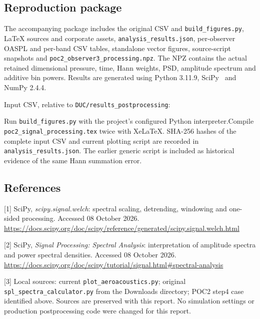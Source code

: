 \documentclass[english]{achleitner-report}
\begin{document}
\subsection*{Reproduction package}
The accompanying package includes the original CSV and \texttt{build\_figures.py}, LaTeX sources and corporate assets, \texttt{analysis\_results.json}, per-observer OASPL and per-band CSV tables, standalone vector figures, source-script snapshots and \texttt{poc2\_observer3\_processing.npz}. The NPZ contains the actual retained dimensional pressure, time, Hann weights, PSD, amplitude spectrum and additive bin powers. Results are generated using Python 3.11.9, SciPy \ScipyVersion\ and NumPy 2.4.4.

Input CSV, relative to \texttt{DUC/results\_postprocessing}:\\
\newline
{}

Run \texttt{build\_figures.py} with the project's configured Python interpreter.\newline Compile \texttt{poc2\_signal\_processing.tex} twice with XeLaTeX. SHA-256 hashes of the complete input CSV and current plotting script are recorded in \texttt{analysis\_results.json}. The earlier generic script is included as historical evidence of the same Hann summation error.

\subsection*{References}
\small
[1] SciPy, \emph{scipy.signal.welch}: spectral scaling, detrending, windowing and one-sided processing. Accessed 08 October 2026.\\
\url{https://docs.scipy.org/doc/scipy/reference/generated/scipy.signal.welch.html}

[2] SciPy, \emph{Signal Processing: Spectral Analysis}: interpretation of amplitude spectra and power spectral densities. Accessed 08 October 2026.\\
\url{https://docs.scipy.org/doc/scipy/tutorial/signal.html#spectral-analysis}

[3] Local sources: current \texttt{plot\_aeroacoustics.py}; original \texttt{spl\_spectra\_calculator.py} from the Downloads directory; POC2 step4 case identified above. Sources are preserved with this report. No simulation settings or production postprocessing code were changed for this report.
\end{document}
